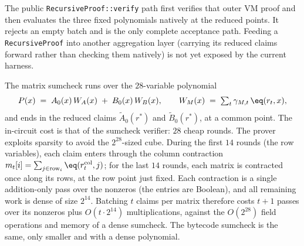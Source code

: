 The public \texttt{RecursiveProof::verify} path first verifies that outer VM proof and then evaluates the three fixed polynomials natively at the reduced points. It rejects an empty batch and is the only complete acceptance path. Feeding a \texttt{RecursiveProof} into another aggregation layer (carrying its reduced claims forward rather than checking them natively) is not yet exposed by the current harness.

The matrix sumcheck runs over the $28$-variable polynomial
\[
  P(x) \;=\; A_0(x)\,W_A(x) \;+\; B_0(x)\,W_B(x),
  \qquad
  W_M(x) \;=\; \textstyle\sum_t \gamma_{M,t}\,\eq(r_t,x),
\]
and ends in the reduced claims $\widetilde A_0(r^\ast)$ and $\widetilde B_0(r^\ast)$, at a common point. The in-circuit cost is that of the sumcheck verifier: $28$ cheap rounds. The prover exploits sparsity to avoid the $2^{28}$-sized cube. During the first $14$ rounds (the row variables), each claim enters through the column contraction $m_t[i]=\sum_{j\in\mathrm{row}_i}\eq(r_t^{\mathrm{col}},j)$; for the last $14$ rounds, each matrix is contracted once along its rows, at the row point just fixed. Each contraction is a single addition-only pass over the nonzeros (the entries are Boolean), and all remaining work is dense of size $2^{14}$. Batching $t$ claims per matrix therefore costs $t+1$ passes over its nonzeros plus $O(t\cdot2^{14})$ multiplications, against the $O(2^{28})$ field operations and memory of a dense sumcheck. The bytecode sumcheck is the same, only smaller and with a dense polynomial.
